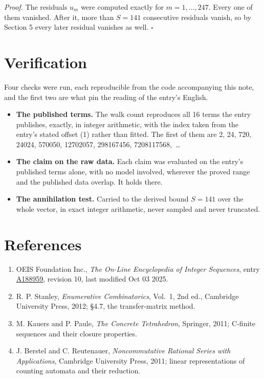 \documentclass[11pt]{article}
\theoremstyle{definition}
\begin{document}
{\itshape Proof.} The residuals $u_m$ were computed exactly for $m = 1,\dots,247$. Every one of them vanished. After it, more than $S = 141$ consecutive residuals vanish, so by Section 5 every later residual vanishes as well. $\square$

\section{Verification}

Four checks were run, each reproducible from the code accompanying this note, and the first two are what pin the reading of the entry's English.

\begin{itemize}

\item {\bfseries The published terms.} The walk count reproduces all 16 terms the entry publishes, exactly, in integer arithmetic, with the index taken from the entry's stated offset (1) rather than fitted. The first of them are 2, 24, 720, 24024, 570050, 12702057, 298167456, 7208117568,~\dots

\item {\bfseries The claim on the raw data.} Each claim was evaluated on the entry's published terms alone, with no model involved, wherever the proved range and the published data overlap. It holds there.

\item {\bfseries The annihilation test.} Carried to the derived bound $S = 141$ over the whole vector, in exact integer arithmetic, never sampled and never truncated.

\end{itemize}

\section{References}

\begin{enumerate}

\item OEIS Foundation Inc., \emph{The On-Line Encyclopedia of Integer Sequences}, entry \href{https://oeis.org/A188959}{A188959}, revision 10, last modified Oct 03 2025.

\item R. P. Stanley, \emph{Enumerative Combinatorics}, Vol.~1, 2nd ed., Cambridge University Press, 2012; \S4.7, the transfer-matrix method.

\item M. Kauers and P. Paule, \emph{The Concrete Tetrahedron}, Springer, 2011; C-finite sequences and their closure properties.

\item J. Berstel and C. Reutenauer, \emph{Noncommutative Rational Series with Applications}, Cambridge University Press, 2011; linear representations of counting automata and their reduction.

\end{enumerate}
\end{document}
